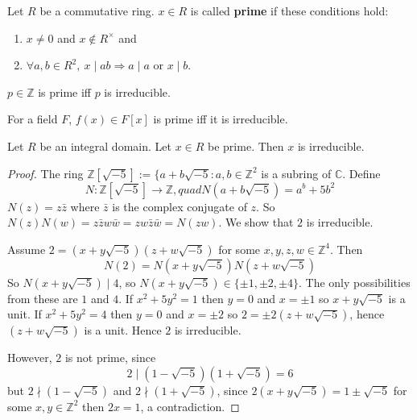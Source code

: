 \begin{definition}
	Let $R$ be a commutative ring. $x \in R$ is called \textbf{prime} if these conditions hold:
	\begin{enumerate}
		\item $x \ne 0$ and $x \notin R^{\times}$ and
		\item $\forall a, b \in R^2, \ x \mid ab \Longrightarrow a \mid a$ or $x \mid b$.
	\end{enumerate}
\end{definition}

\begin{example}
	$p \in \mathbb{Z}$ is prime iff $p$ is irreducible.
\end{example}

\begin{example}
	For a field $F$, $f(x) \in F[x]$ is prime iff it is irreducible.
\end{example}

\begin{lemma}
	Let $R$ be an integral domain. Let $x \in R$ be prime. Then $x$ is irreducible.
\end{lemma}

\begin{proof}
	The ring $\mathbb{Z}[\sqrt{-5}] := \{ a + b \sqrt{-5}: a, b \in \mathbb{Z}^2$ is a subring of $\mathbb{C}$. Define
	\[
		N: \mathbb{Z}[\sqrt{-5}] \rightarrow \mathbb{Z}, quad N(a + b \sqrt{-5}) = a^b + 5 b^2
	\]
	$N(z) = z \bar{z}$ where $\bar{z}$ is the complex conjugate of $z$. So $N(z) N(w) = z \bar{z} w \bar{w} = z w \bar{z} \bar{w} = N(zw)$. We show that $2$ is irreducible.

	Assume $2 = (x + y \sqrt{-5}) (z + w \sqrt{-5})$ for some $x, y, z, w \in \mathbb{Z}^4$. Then
	\[
		N(2) = N(x + y \sqrt{-5}) N(z + w \sqrt{-5})
	\]
	So $N(x + y \sqrt{-5}) \mid 4$, so $N(x + y \sqrt{-5}) \in \{ \pm 1, \pm 2, \pm 4 \}$. The only possibilities from these are $1$ and $4$. If $x^2 + 5y^2 = 1$ then $y = 0$ and $x = \pm 1$ so $x + y \sqrt{-5}$ is a unit. If $x^2 + 5y^2 = 4$ then $y = 0$ and $x = \pm 2$ so $2 = \pm 2 (z + w \sqrt{-5})$, hence $(z + w \sqrt{-5})$ is a unit. Hence $2$ is irreducible.

	However, $2$ is not prime, since
	\[
		2 \mid (1 - \sqrt{-5}) (1 + \sqrt{-5}) = 6
	\]
	but $2 \nmid (1 - \sqrt{-5})$ and $2 \nmid (1 + \sqrt{-5})$, since $2(x + y \sqrt{-5}) = 1 \pm \sqrt{-5}$ for some $x, y \in \mathbb{Z}^2$ then $2x = 1$, a contradiction.
\end{proof}

